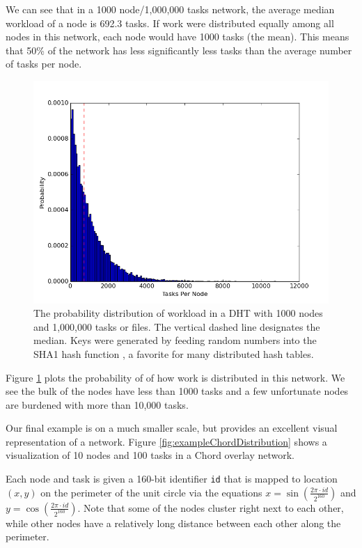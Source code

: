 \documentclass[10pt,conference]{IEEEtran}
\begin{document}
We can see  that in a 1000 node/1,000,000 tasks network, the average median workload of a node is 692.3 tasks. 
If work were distributed equally among all nodes in this network, each node would have 1000 tasks (the mean).
This means that 50\% of the network has less significantly less tasks than the average number of tasks per node.



\begin{figure}[h!]
	\centering
	\includegraphics[width=0.9\linewidth]{figs/workloadDistribution}
	\caption[Workload Distribution in a DHT]{The probability distribution of workload in a DHT with 1000 nodes and 1,000,000 tasks or files.  The vertical dashed line designates the median.  Keys were generated by feeding random numbers into the SHA1 hash function \cite{sha1}, a favorite for many distributed hash tables.}
	\label{fig:workloadDistribution}
\end{figure}

Figure \ref{fig:workloadDistribution} plots the probability of of how work is distributed in this network.
We see the bulk of the nodes have less than 1000 tasks and a few unfortunate nodes are burdened with more than 10,000 tasks.


Our final example is on a much smaller scale, but provides an excellent visual representation of a network.
Figure \ref{fig:exampleChordDistribution} shows a visualization of 10 nodes and 100 tasks in a Chord overlay network.

Each node and task is given a 160-bit identifier \texttt{id} that is mapped to location $ (x,y) $ on the perimeter of the unit circle via the equations $ x = \sin\left( \frac{ 2 \pi \cdot id}{2^{160}} \right)$ and $ y = \cos\left( \frac{ 2 \pi \cdot id}{2^{160}} \right)$. 
Note that some of the nodes cluster right next to each other, while other nodes have a relatively long distance between each other along the perimeter.  
\end{document}
